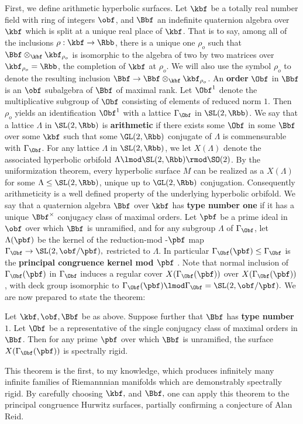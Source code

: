 \documentclass[12pt]{article}
\begin{document}
 First,  we define arithmetic hyperbolic surfaces. Let  $\kbf$ be a totally real number field with ring of integers $\obf$,  and $\Bbf$ an indefinite quaternion algebra over $\kbf$ which is split at a unique real place of $\kbf$. That is to say, among all of the inclusions $\rho:  \kbf \to \Rbb$, there is a unique  one $\rho_o$ such that $\Bbf \otimes_{\kbf}  \kbf_{\rho_o} $ is isomorphic to the algebra of two by two matrices over $\kbf_{\rho_o} =\Rbb$, the completion of $\kbf$ at $\rho_o$.  We will also use the symbol $\rho_o$ to denote the resulting inclusion $\Bbf \to \Bbf \otimes_{\kbf}  \kbf_{\rho_o} $. An {\bf order} $\Obf$ in $\Bbf$ is an $\obf$ subalgebra of $\Bbf$ of maximal rank.  Let $\Obf^1$ denote the multiplicative subgroup  of $\Obf$ consisting of elements of reduced norm  $1$.  Then $\rho_o$ yields an identification $\Obf^1$ with a lattice $\Gamma_\Obf$ in $\SL(2,\Rbb)$.  We say that a lattice $\Lambda$ in $\SL(2,\Rbb)$ is {\bf arithmetic}  if there exists some $\Obf$ in some $\Bbf$ over some $\kbf$ such that some $\GL(2,\Rbb)$ conjugate of $\Lambda$ is commensurable with $\Gamma_{\Obf}$.  For any lattice $\Lambda$ in $\SL(2,\Rbb)$, we let $X(\Lambda)$ denote the associated hyperbolic orbifold  $\Lambda \lmod \SL(2,\Rbb) \rmod  \SO(2)$. By the uniformization theorem, every hyperbolic surface $M$ can be realized as a $X(\Lambda)$ for some $\Lambda \leq \SL(2,\Rbb)$, unique up to $\GL(2,\Rbb)$  conjugation. Consequently arithmeticity is a well defined property of the underlying hyperbolic orbifold.  We say that a quaternion algebra $\Bbf$ over $\kbf$ has {\bf type number one} if it has a unique $\Bbf^\times$ conjugacy class of maximal orders.  Let $\pbf$ be a prime ideal in $\obf$ over which $\Bbf$ is unramified, and for any subgroup  $\Lambda$ of $\Gamma_\Obf$, let $\Lambda(\pbf)$ be the kernel of the reduction-mod -$\pbf$ map $\Gamma_\Obf \to \SL(2,\obf/\pbf),$  restricted to $\Lambda$.  In particular $\Gamma_\Obf(\pbf) \leq \Gamma_\Obf$ is the {\bf principal congruence kernel mod $\pbf$} . Note that normal inclusion of $\Gamma_\Obf(\pbf)$ in $\Gamma_\Obf$ induces a regular cover $X(\Gamma_\Obf(\pbf))$ over $X(\Gamma_\Obf(\pbf))$, with deck group isomorphic to  $\Gamma_\Obf(\pbf)  \lmod \Gamma_\Obf = \SL(2,\obf /\pbf).$  We are now prepared to state the theorem:
 \begin{thm}
 	Let $\kbf, \obf, \Bbf$ be as above. Suppose further that $\Bbf$ has {\bf type number $1$}. Let $\Obf$ be a representative of the single conjugacy class of maximal orders in $\Bbf$. Then for any prime $\pbf$ over which $\Bbf$ is unramified,  the surface $X(\Gamma_\Obf(\pbf))$  is spectrally rigid. 
 \end{thm}
This theorem is the first, to my knowledge, which  produces infinitely many infinite families of Riemannnian manifolds which are demonstrably spectrally rigid. By carefully  choosing $\kbf,$ and $\Bbf,$ one can  apply this theorem to the principal congruence Hurwitz surfaces, partially confirming a conjecture of Alan Reid. 
\end{document}
